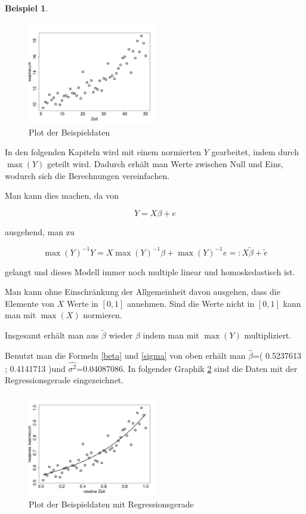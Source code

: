 \documentclass[12pt,a4paper]{article}
\theoremstyle{definition}
\newtheorem{Beispiel}[Definition]{Beispiel}
\theoremstyle{definition}
\theoremstyle{definition}
\theoremstyle{definition}
\newcommand{\betaoneest}{( 0.5237613 ; 0.4141713 )}
\newcommand{\sigmaoneest}{0.04087086}
\begin{document}
\begin{Beispiel}
\begin{figure}[H] 
  \centering
     \includegraphics[width=0.5\textwidth]{data-raw-R}
  \caption{Plot der Beispieldaten}
  \label{Beispieldaten}
\end{figure}

In den folgenden Kapiteln wird mit einem normierten $Y$ gearbeitet, indem durch $\max(Y)$ geteilt wird. Dadurch erhält man Werte zwischen Null und Eins, wodurch sich die Berechnungen vereinfachen.

Man kann dies machen, da von 

\begin{equation*}
Y=X\beta+e
\end{equation*}

ausgehend, man zu 

\begin{equation*}
\max(Y)^{-1} Y = X \max(Y)^{-1} \beta + \max(Y)^{-1} e =: X \tilde{\beta} + \tilde{e}
\end{equation*}

gelangt und dieses Modell immer noch multiple linear und homoskedastisch ist. 

Man kann ohne Einschränkung der Allgemeinheit davon ausgehen, dass die Elemente von $X$ Werte in $[0,1]$ annehmen. Sind die Werte nicht in $[0,1]$ kann man mit $\max(X)$ normieren.

Insgesamt erhält man aus $\tilde{\beta}$ wieder $\beta$ indem man mit $\max(Y)$ multipliziert.  

Benutzt man die Formeln \eqref{beta} und \eqref{sigma} von oben erhält man  $\hat{\beta}$=\betaoneest und $\widehat{\sigma^2}$=\sigmaoneest. In folgender Graphik \ref{Beispieldaten_Regressionsgerade} sind die Daten mit der Regressionsgerade eingezeichnet.

\begin{figure}[H] 
  \centering
     \includegraphics[width=0.5\textwidth]{regression-gerade}
  \caption{Plot der Beispieldaten mit Regressionsgerade}
  \label{Beispieldaten_Regressionsgerade}
\end{figure}
 
\end{Beispiel} 
\end{document}
